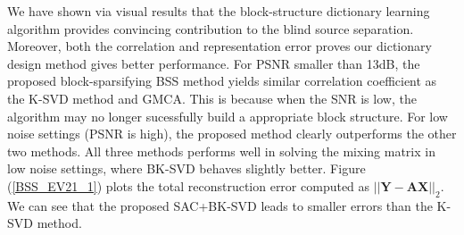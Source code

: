 We have shown via visual results that the block-structure dictionary learning algorithm provides convincing contribution to the blind source separation. Moreover, both the correlation and representation error proves our dictionary design method gives better performance. For PSNR smaller than 13dB, the proposed block-sparsifying BSS method yields similar correlation coefficient as the K-SVD method and GMCA. This is because when the SNR is low, the algorithm may no longer sucessfully build a appropriate block structure. For low noise settings (PSNR is high), the proposed method clearly outperforms the other two methods. All three methods performs well in solving the mixing matrix in low noise settings, where BK-SVD behaves slightly better. Figure (\ref{BSS_EV21_1}) plots the total reconstruction error computed as $||\mathbf{Y} - \mathbf{AX}||_2$. We can see that the proposed SAC+BK-SVD leads to smaller errors than the K-SVD method.\\


